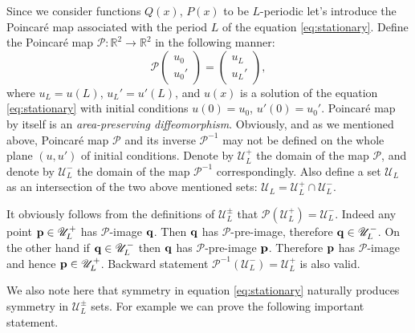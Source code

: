 Since we consider functions $Q(x)$, $P(x)$ to be $L$-periodic let's introduce the Poincar\'e map associated with the period $L$ of the equation \eqref{eq:stationary}.
Define the Poincar\'e map $\mathcal{P}: \mathbb{R}^2 \to \mathbb{R}^2$ in the following manner:
\begin{equation}
	\mathcal{P} \begin{pmatrix} u_0 \\ u_0' \end{pmatrix}
	= \begin{pmatrix} u_L \\ u_L' \end{pmatrix},
\label{eq:poincare-map}
\end{equation}
where $u_L = u(L)$, $u_L' = u'(L)$, and $u(x)$ is a solution of the equation \eqref{eq:stationary} with initial conditions $u(0) = u_0$, $u'(0) = u_0'$.
Poincar\'e map by itself is an {\it area-preserving diffeomorphism}.
Obviously, and as we mentioned above, Poincar\'e map $\mathcal{P}$ and its inverse $\mathcal{P}^{-1}$ may not be defined on the whole plane $(u, u')$ of initial conditions.
Denote by $\mathscr{U}_L^+$ the domain of the map $\mathcal{P}$, and denote by $\mathscr{U}_L^-$ the domain of the map $\mathcal{P}^{-1}$ correspondingly.
Also define a set $\mathscr{U}_L$ as an intersection of the two above mentioned sets: $\mathscr{U}_L = \mathscr{U}_L^+ \cap \mathscr{U}_L^-$.

It obviously follows from the definitions of $\mathscr{U}_L^{\pm}$ that $\mathcal{P}(\mathscr{U}_L^+) = \mathscr{U}_L^-$.
Indeed any point $\vb{p} \in \mathscr{U}_L^+$ has $\mathcal{P}$-image $\vb{q}$.
Then $\vb{q}$ has $\mathcal{P}$-pre-image, therefore $\vb{q} \in \mathscr{U}_L^-$.
On the other hand if $\vb{q} \in \mathscr{U}_L^-$ then $\vb{q}$ has $\mathcal{P}$-pre-image $\vb{p}$.
Therefore $\vb{p}$ has $\mathcal{P}$-image and hence $\vb{p} \in \mathscr{U}_L^+$.
Backward statement $\mathcal{P}^{-1}(\mathscr{U}_L^-) = \mathscr{U}_L^+$ is also valid.

We also note here that symmetry in equation \eqref{eq:stationary} naturally produces symmetry in $\mathscr{U}_L^{\pm}$ sets.
For example we can prove the following important statement.

